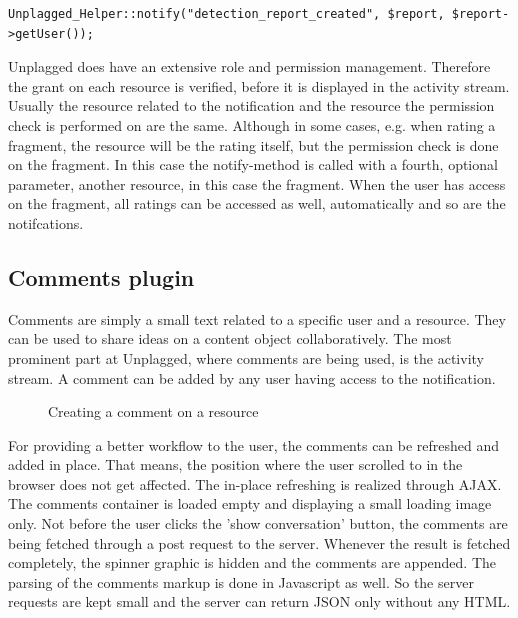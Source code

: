 \begin{lstlisting}[caption=Creating a notification for a created report]
Unplagged_Helper::notify("detection_report_created", $report, $report->getUser());
\end{lstlisting}

Unplagged does have an extensive role and permission management. Therefore the grant on each resource is verified, before it is displayed in the activity stream. Usually the resource related to the notification and the resource the permission check is performed on are the same. Although in some cases, e.g. when rating a fragment, the resource will be the rating itself, but the permission check is done on the fragment. In this case the notify-method is called with a fourth, optional parameter, another resource, in this case the fragment. When the user has access on the fragment, all ratings can be accessed as well, automatically and so are the notifcations.

\subsection{Comments plugin}

Comments are simply a small text related to a specific user and a resource. They can be used to share ideas on a content object collaboratively. The most prominent part at Unplagged, where comments are being used, is the activity stream. A comment can be added by any user having access to the notification. 

\begin{figure}[!h]
  \centering
  \caption{Creating a comment on a resource}
  \label{fig:creating-a-comment}
\end{figure}

For providing a better workflow to the user, the comments can be refreshed and added in place. That means, the position where the user scrolled to in the browser does not get affected. The in-place refreshing is realized through AJAX. The comments container is loaded empty and displaying a small loading image only. Not before the user clicks the 'show conversation' button, the comments are being fetched through a post request to the server. Whenever the result is fetched completely, the spinner graphic is hidden and the comments are appended. The parsing of the comments markup is done in Javascript as well. So the server requests are kept small and the server can return JSON only without any HTML.

